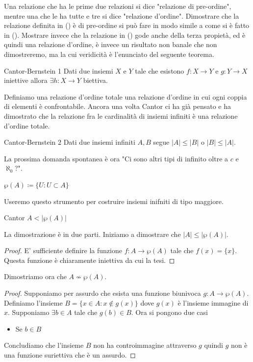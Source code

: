 Una relazione che ha le prime due relazioni si dice "relazione di pre-ordine", mentre una che le ha tutte e tre si dice "relazione d'ordine". Dimostrare che la relazione definita in () è di pre-ordine si può fare in modo simile a come si è fatto in (). Mostrare invece che la relazione in () gode anche della terza propietà, ed è quindi una relazione d'ordine, è invece un risultato non banale che non dimostreremo, ma la cui veridicità è l'enunciato del seguente teorema.
\begin{theorem}{Cantor-Bernstein 1}
    Dati due insiemi $X$ e $Y$ tale che esistono $f:X\rightarrow Y$ e $g:Y\rightarrow X$ iniettive allora $\exists h:X\rightarrow Y$ biettiva.
\end{theorem}
Definiamo una relazione d'ordine totale una relazione d'ordine in cui ogni coppia di elementi è confrontabile. Ancora una volta Cantor ci ha già pensato e ha dimostrato che la relazione fra le cardinalità di insiemi infiniti è una relazione d'ordine totale.
\begin{theorem}{Cantor-Bernstein 2}
Dati due insiemi infiniti $A,B$ segue $|A|\le|B|$ o $|B|\le|A|$.
\end{theorem}
La prossima domanda spontanea è ora "Ci sono altri tipi di infinito oltre a $c$ e $\aleph_0$?".
\begin{definition}{}
    $\wp(A) \coloneqq \{U:U\subset A \}$
\end{definition}
Useremo questo strumento per costruire insiemi inifniti di tipo maggiore.
\begin{theorem}{Cantor}
    $A<|\wp (A)| $
\end{theorem}
La dimostrazione è in due parti. Iniziamo a dimostrare che $|A|\le |\wp(A)|$.
\begin{proof}
E' sufficiente definire la funzione $f:A\rightarrow \wp(A)$ tale che $f(x) = \{x\}$. Questa funzione è chiaramente iniettiva da cui la tesi.
\end{proof}
Dimostriamo ora che $A \not \sim \wp(A)$.
\begin{proof}
Supponiamo per assurdo che esista una funzione biunivoca $g:A\rightarrow \wp(A)$. Definiamo l'insieme $B = \{x\in A: x \not \in g(x) \}$ dove $g(x)$ è l'insieme immagine di $x$. Supponiamo $\exists b\in A$ tale che $g(b) \in B$. Ora si pongono due casi
\begin{itemize}
    \item Se $b\in B$
\end{itemize}
Concludiamo che l'insieme $B$ non ha controimmagine attraverso $g$ quindi $g$ non è una funzione suriettiva che è un assurdo.
\end{proof}
